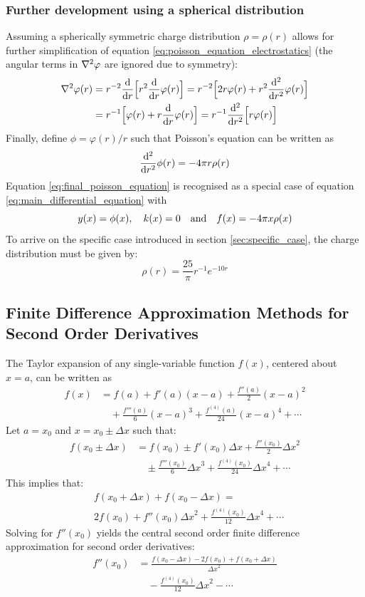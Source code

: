 \documentclass[reprint,english]{revtex4-1}
\begin{document}
\subsubsection{Further development using a spherical distribution}
Assuming a spherically symmetric charge distribution \(\rho=\rho(r)\) allows for further simplification of equation \eqref{eq:poisson_equation_electrostatics} (the angular terms in \(\laplacian\varphi\) are ignored due to symmetry):
\begin{align*}
\laplacian\varphi(r)&=r^{-2}\dv{r}\Big[r^2\dv{r}\varphi(r)\Big]=r^{-2}\Big[2r\varphi(r)+r^2\dv[2]{r}\varphi(r)\Big]\\
&=r^{-1}\Big[\varphi(r)+r\dv{r}\varphi(r)\Big]=r^{-1}\dv[2]{r}\Big[r\varphi(r)\Big]
\end{align*}
Finally, define \(\phi=\varphi(r)/r\) such that Poisson's equation can be written as
\begin{equation}\label{eq:final_poisson_equation}
\dv[2]{r}\phi(r)=-4\pi r\rho(r)
\end{equation}
Equation \eqref{eq:final_poisson_equation} is recognised as a special case of equation \eqref{eq:main_differential_equation} with
\[y(x)=\phi(x)\qcomma k(x)=0\qand f(x)=-4\pi x\rho(x)\]
To arrive on the specific case introduced in section \ref{sec:specific_case}, the charge distribution must be given by:
\[\rho(r)=\frac{25}{\pi}r^{-1}e^{-10r}\]
\subsection{Finite Difference Approximation Methods for Second Order Derivatives}\label{sec:finite_difference_methods}
The Taylor expansion of any single-variable function \(f(x)\), centered about \(x=a\), can be written as
\begin{align}
f(x)&= f(a)+f'(a)(x-a)+\frac{f''(a)}{2}(x-a)^2\nonumber\\
&\quad +\frac{f'''(a)}{6}(x-a)^3+\frac{f^{(4)}(a)}{24}(x-a)^4+\cdots\label{eq:second_order_taylor_expansion}
\end{align}
Let \(a=x_0\) and \(x=x_0\pm\Delta x\) such that:
\begin{align}
f(x_0\pm\Delta x)&=f(x_0)\pm f'(x_0)\Delta x+\frac{f''(x_0)}{2}{\Delta x}^2\nonumber\\
&\quad \pm\frac{f'''(x_0)}{6}{\Delta x}^3+\frac{f^{(4)}(x_0)}{24}{\Delta x}^4+\cdots
\end{align}
This implies that:
\begin{align*}
&f(x_0+\Delta x)+f(x_0-\Delta x)=\\
&2f(x_0)+f''(x_0){\Delta x}^2+\frac{f^{(4)}(x_0)}{12}{\Delta x}^4+\cdots
\end{align*}
Solving for \(f''(x_0)\) yields the central second order finite difference approximation for second order derivatives:
\begin{align}
f''(x_0)&=\frac{f(x_0-\Delta x)-2f(x_0)+f(x_0+\Delta x)}{{\Delta x}^2}\nonumber\\
&\quad -\frac{f^{(4)}(x_0)}{12}{\Delta x}^2-\cdots\label{eq:second_order_finite_difference_approximation}
\end{align}
\end{document}
